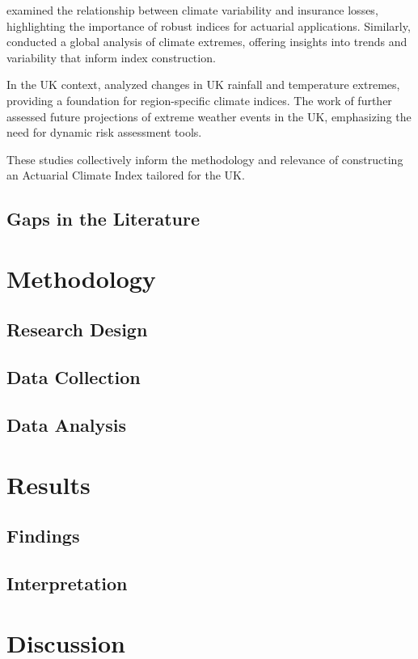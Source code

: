 \documentclass[12pt,a4paper]{report}
\begin{document}
\citet{zwiers2011climate} examined the relationship between climate variability and insurance losses, highlighting the importance of robust indices for actuarial applications. Similarly, \citet{alexander2006global} conducted a global analysis of climate extremes, offering insights into trends and variability that inform index construction.

In the UK context, \citet{kendon2014uk} analyzed changes in UK rainfall and temperature extremes, providing a foundation for region-specific climate indices. The work of \citet{palin2016future} further assessed future projections of extreme weather events in the UK, emphasizing the need for dynamic risk assessment tools.

These studies collectively inform the methodology and relevance of constructing an Actuarial Climate Index tailored for the UK.
\section{Gaps in the Literature}

\chapter{Methodology}
\section{Research Design}
\section{Data Collection}
\section{Data Analysis}

\chapter{Results}
\section{Findings}
\section{Interpretation}

\chapter{Discussion}
\end{document}
